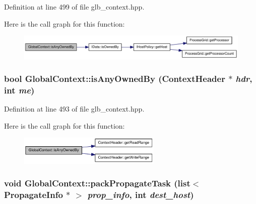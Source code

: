 Definition at line 499 of file glb\_\-context.hpp.

Here is the call graph for this function:\nopagebreak
\begin{figure}[H]
\begin{center}
\leavevmode
\includegraphics[width=336pt]{class_global_context_a33b1aec3eb90bf8bfca3307d47058606_cgraph}
\end{center}
\end{figure}
\hypertarget{class_global_context_aab60de99c252ba5fe7e2d1fdbfa0ba6c}{
\subsubsection[{isAnyOwnedBy}]{\setlength{\rightskip}{0pt plus 5cm}bool GlobalContext::isAnyOwnedBy ({\bf ContextHeader} $\ast$ {\em hdr}, \/  int {\em me})}}
\label{class_global_context_aab60de99c252ba5fe7e2d1fdbfa0ba6c}


Definition at line 493 of file glb\_\-context.hpp.

Here is the call graph for this function:\nopagebreak
\begin{figure}[H]
\begin{center}
\leavevmode
\includegraphics[width=193pt]{class_global_context_aab60de99c252ba5fe7e2d1fdbfa0ba6c_cgraph}
\end{center}
\end{figure}
\hypertarget{class_global_context_ab6ed24acc55b88a93b7498acbccf6141}{
\subsubsection[{packPropagateTask}]{\setlength{\rightskip}{0pt plus 5cm}void GlobalContext::packPropagateTask (list$<$ {\bf PropagateInfo} $\ast$ $>$ {\em prop\_\-info}, \/  int {\em dest\_\-host})}}
\label{class_global_context_ab6ed24acc55b88a93b7498acbccf6141}


